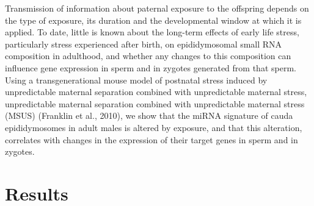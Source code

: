 \documentclass[12pt,twoside]{reedthesis}
\begin{document}
Transmission of information about paternal exposure to the offspring depends on the type of exposure, its duration and the developmental window at which it is applied. To date, little is known about the long-term effects of early life stress, particularly stress experienced after birth, on epididymosomal small RNA composition in adulthood, and whether any changes to this composition can influence gene expression in sperm and in zygotes generated from that sperm. Using a transgenerational mouse model of postnatal stress induced by unpredictable maternal separation combined with unpredictable maternal stress, unpredictable maternal separation combined with unpredictable maternal stress (MSUS) (Franklin et al., 2010), we show that the miRNA signature of cauda epididymosomes in adult males is altered by exposure, and that this alteration, correlates with changes in the expression of their target genes in sperm and in zygotes.

\newpage

\hypertarget{results-1}{%
\section{Results}\label{results-1}}
\end{document}
